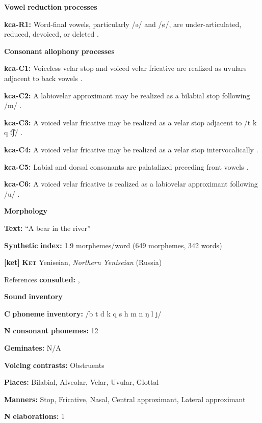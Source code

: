 \begin{styleBody}
\textbf{Vowel} \textbf{reduction} \textbf{processes}

\textbf{kca-R1:} Word-final vowels, particularly /ə/ and /ø/, are under-articulated, reduced, devoiced, or deleted \citep[56]{Filchenko2007}.

\textbf{Consonant} \textbf{allophony} \textbf{processes}

\textbf{kca-C1:} Voiceless velar stop and voiced velar fricative are realized as uvulars adjacent to back vowels \citep[41]{Filchenko2007}.

\textbf{kca-C2:} A labiovelar approximant may be realized as a bilabial stop following /m/ \citep[44-45]{Filchenko2007}.

\textbf{kca-C3:} A voiced velar fricative may be realized as a velar stop adjacent to /t k q t͡ʃ/ \citep[45]{Filchenko2007}.

\textbf{kca-C4:} A voiced velar fricative may be realized as a velar stop intervocalically \citep[45]{Filchenko2007}.

\textbf{kca-C5:} Labial and dorsal consonants are palatalized preceding front vowels \citep[37]{Filchenko2007}.

\textbf{kca-C6:} A voiced velar fricative is realized as a labiovelar approximant following /u/ \citep[45-6]{Filchenko2007}.

\textbf{Morphology}

\textbf{Text:} “A bear in the river” \citep[582-588]{Filchenko2007}

\textbf{Synthetic} \textbf{index:} 1.9 morphemes/word (649 morphemes, 342 words)

\textbf{[ket]}   \textbf{\textsc{Ket}}  Yeniseian, \textit{Northern} \textit{Yeniseian} (Russia)

References \textbf{consulted:} \citet{Georg2007}, \citet{Vajda2000}

\textbf{Sound} \textbf{inventory}

\textbf{C} \textbf{phoneme} \textbf{inventory:} /b t d k q s h m n ŋ l j/

\textbf{N} \textbf{consonant} \textbf{phonemes:} 12

\textbf{Geminates:} N/A

\textbf{Voicing} \textbf{contrasts:} Obstruents

\textbf{Places:} Bilabial, Alveolar, Velar, Uvular, Glottal

\textbf{Manners:} Stop, Fricative, Nasal, Central approximant, Lateral approximant

\textbf{N} \textbf{elaborations:} 1


\end{styleBody}
